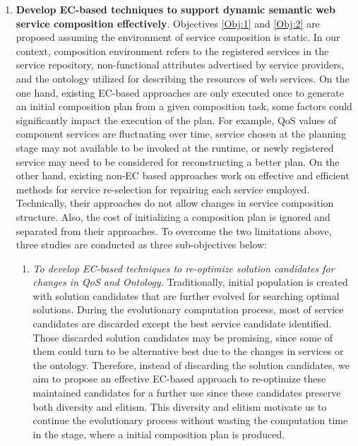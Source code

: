 \begin{enumerate}
\begin{enumerate}
   \end{enumerate}
   
\vspace{0.5cm}
 \item \textbf{Develop EC-based techniques to support dynamic semantic web service composition effectively}. Objectives \ref{Obj:1} and \ref{Obj:2} are proposed assuming the environment of service composition is static. In our context, composition environment refers to the registered services in the service repository, non-functional attributes advertised by service providers, and the ontology utilized for describing the resources of web services. On the one hand, existing EC-based approaches are only executed once to generate an initial composition plan from a given composition task, some factors could significantly impact the execution of the plan. For example, QoS values of component services are fluctuating over time, service chosen at the planning stage may not available to be invoked at the runtime, or newly registered service may need to be considered for reconstructing a better plan. On the other hand, existing non-EC based approaches \cite{nasridinov2012qos,salas2006ws,wagner2016robust,yin2010qos} work on effective and efficient methods for service re-selection for repairing each service employed. Technically, their approaches do not allow changes in service composition structure. Also, the cost of initializing a composition plan is ignored and separated from their approaches. To overcome the two limitations above, three studies are conducted as three sub-objectives below:

  \begin{enumerate}
 \item \label{Obj:3.1} \emph{To develop EC-based techniques to re-optimize solution candidates for changes in QoS and Ontology.} Traditionally, initial population is created with solution candidates that are further evolved for searching optimal solutions. During the evolutionary computation process, most of service candidates are discarded except the best service candidate identified. Those discarded solution candidates may be promising, since some of them could turn to be alternative best due to the changes in services or the ontology. Therefore, instead of discarding the solution candidates, we aim to propose an effective EC-based approach to re-optimize these maintained candidates for a further use since these candidates preserve both diversity and elitism. This diversity and elitism motivate us to continue the evolutionary process without wasting the computation time in the stage, where a initial composition plan is produced.


\end{enumerate}
\end{enumerate}
